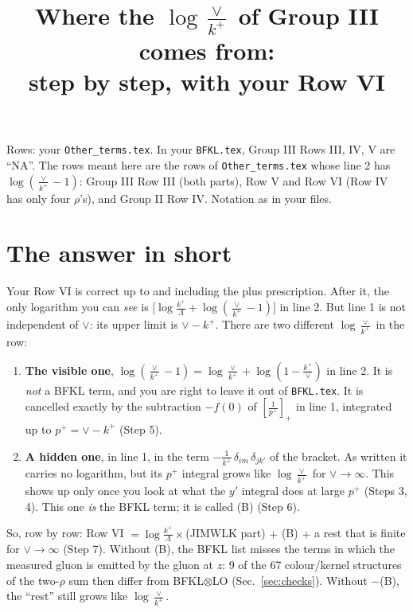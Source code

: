 \documentclass[10pt]{article}
\title{Where the $\log\frac{\vee}{k^+}$ of Group III comes from:\\ step by step, with your Row VI}
\date{}
\numberwithin{equation}{section}
\begin{document}
\maketitle
\noindent Rows: your \texttt{Other\_terms.tex}. In your \texttt{BFKL.tex}, Group III Rows III, IV, V are ``NA''. The rows meant here are the rows of \texttt{Other\_terms.tex} whose line 2 has $\log(\frac{\vee}{k^+}-1)$: Group III Row III (both parts), Row V and Row VI (Row IV has only four $\rho$'s), and Group II Row IV. Notation as in your files.

\section{The answer in short}
Your Row VI is correct up to and including the plus prescription. After it, the only logarithm you can \emph{see} is $\big[\log\frac{k^+}{\Lambda}+\log(\frac{\vee}{k^+}-1)\big]$ in line 2. But line 1 is not independent of $\vee$: its upper limit is $\vee-k^+$. There are two different $\log\frac{\vee}{k^+}$ in the row:
\begin{enumerate}
\item \textbf{The visible one}, $\log(\frac{\vee}{k^+}-1)=\log\frac{\vee}{k^+}+\log(1-\frac{k^+}{\vee})$ in line 2. It is \emph{not} a BFKL term, and you are right to leave it out of \texttt{BFKL.tex}. It is cancelled exactly by the subtraction $-f(0)$ of $\left[\frac{1}{p^+}\right]_+$ in line 1, integrated up to $p^+=\vee-k^+$ (Step 5).
\item \textbf{A hidden one}, in line 1, in the term $-\frac{1}{k^+}\,\delta_{im}\,\delta_{jk'}$ of the bracket. As written it carries no logarithm, but its $p^+$ integral grows like $\log\frac{\vee}{k^+}$ for $\vee\to\infty$. This shows up only once you look at what the $y'$ integral does at large $p^+$ (Steps 3, 4). This one \emph{is} the BFKL term; it is called (B) (Step 6).
\end{enumerate}
So, row by row: Row VI $=\log\frac{k^+}{\Lambda}\times$(JIMWLK part) $+$ (B) $+$ a rest that is finite for $\vee\to\infty$ (Step 7). Without (B), the BFKL list misses the terms in which the measured gluon is emitted by the gluon at $z$: 9 of the 67 colour/kernel structures of the two-$\rho$ sum then differ from BFKL$\otimes$LO (Sec.~\ref{sec:checks}). Without $-$(B), the ``rest'' still grows like $\log\frac{\vee}{k^+}$.
\end{document}
